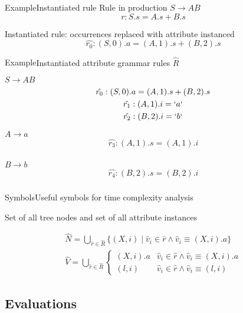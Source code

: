 \begin{frame}{Example}{Instantiated rule}
Rule in production $S \rightarrow A B$
\[ r: S.s = A.s + B.s  \]

Instantiated rule: occurrences replaced with \alert{attribute instanced}
\[ \hat{r_0}: (S, 0).a = (A, 1).s + (B,2).s  \]
\end{frame}

\begin{frame}{Example}{Instantiated attribute grammar rules $\hat{R}$}


{\small
$S \rightarrow A B$
\begin{gather*}
\hat{r_0}: (S, 0).a = (A, 1).s + (B,2).s \\
\hat{r_1}: (A, 1).i = `a` \\
\hat{r_2}: (B, 2).i = `b`
\end{gather*}

$A \rightarrow a$
\begin{gather*}
\hat{r_3}: (A,1).s = (A,1).i \\
\end{gather*}

$B \rightarrow b$
\begin{gather*}
\hat{r_4}: (B,2).s = (B,2).i \\
\end{gather*}
}



\end{frame}


\begin{frame}{Symbols}{Useful symbols for time complexity analysis}

Set of \alert{all tree nodes} and set of \alert{all attribute instances}

\begin{equation}
\begin{gathered}
    \hat{N} = \bigcup_{\hat r \in \hat R} \{ (X, i) \mid \hat v_i \in \hat r \wedge \hat v_i \equiv (X, i).a \}  \\
    \hat{V} = \bigcup_{\hat r \in \hat R} \begin{cases}
(X, i).a &  \hat v_i \in \hat r \wedge \hat v_i \equiv (X, i).a \\
(l, i)   &  \hat v_i \in \hat r \wedge \hat v_i \equiv (l, i) 
\end{cases}
\end{gathered}
\end{equation}
\end{frame}


\subsection*{Evaluations}

